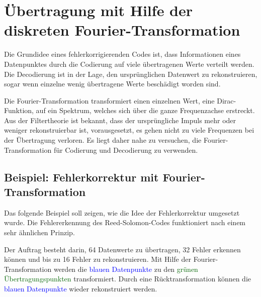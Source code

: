 %
%
\section{Übertragung mit Hilfe der diskreten Fourier-Transformation
\label{reedsolomon:section:dtf}}
Die Grundidee eines fehlerkorrigierenden Codes ist, dass Informationen eines Datenpunktes
durch die Codierung auf viele übertragenen Werte verteilt werden.
Die Decodierung ist in der Lage, den ursprünglichen Datenwert zu rekonstruieren,
sogar wenn einzelne wenig übertragene Werte beschädigt worden sind.
\par
Die Fourier-Transformation transformiert einen einzelnen Wert, 
%
eine Dirac-Funktion, auf ein Spektrum, welches sich über die ganze Frequenzachse erstreckt.
%
%
Aus der Filtertheorie ist bekannt, dass der ursprüngliche Impuls mehr oder weniger rekonstruierbar ist,
	vorausgesetzt, es gehen nicht zu viele Frequenzen bei der Übertragung verloren.
%
Es liegt daher nahe zu versuchen, die Fourier-Transformation 
für Codierung und Decodierung zu verwenden.

\subsection{Beispiel: Fehlerkorrektur mit Fourier-Transformation
\label{reedsolomon:subsection:sendbsp}}
Das folgende Beispiel soll zeigen, wie die Idee der Fehlerkorrektur umgesetzt wurde. 
Die Fehlererkennung des Reed-Solomon-Codes funktioniert nach einem sehr ähnlichen Prinzip.
%

\par
Der Auftrag besteht darin, 64 Datenwerte zu übertragen, 32 Fehler erkennen können und bis zu 16 Fehler zu rekonstruieren.
Mit Hilfe der Fourier-Transformation werden die \textcolor{blue}{blauen Datenpunkte}
zu den \textcolor{darkgreen}{grünen Übertragungspunkten} transformiert. 
Durch eine Rücktransformation können die \textcolor{blue}{blauen Datenpunkte} wieder rekonstruiert werden.

